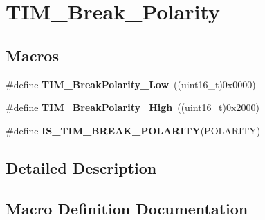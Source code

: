 \hypertarget{group___t_i_m___break___polarity}{}\section{T\+I\+M\+\_\+\+Break\+\_\+\+Polarity}
\label{group___t_i_m___break___polarity}
\subsection*{Macros}
\begin{DoxyCompactItemize}
\item 
\hypertarget{group___t_i_m___break___polarity_ga565656ca81d17f9a1807afe3971dff6e}{}\#define {\bfseries T\+I\+M\+\_\+\+Break\+Polarity\+\_\+\+Low}~((uint16\+\_\+t)0x0000)\label{group___t_i_m___break___polarity_ga565656ca81d17f9a1807afe3971dff6e}

\item 
\hypertarget{group___t_i_m___break___polarity_gabd4b72079548fd8903413a348539542b}{}\#define {\bfseries T\+I\+M\+\_\+\+Break\+Polarity\+\_\+\+High}~((uint16\+\_\+t)0x2000)\label{group___t_i_m___break___polarity_gabd4b72079548fd8903413a348539542b}

\item 
\#define {\bfseries I\+S\+\_\+\+T\+I\+M\+\_\+\+B\+R\+E\+A\+K\+\_\+\+P\+O\+L\+A\+R\+I\+T\+Y}(P\+O\+L\+A\+R\+I\+T\+Y)
\end{DoxyCompactItemize}


\subsection{Detailed Description}


\subsection{Macro Definition Documentation}
\hypertarget{group___t_i_m___break___polarity_gaa29e33e74c5ff10972357ddd3f47f078}{}
